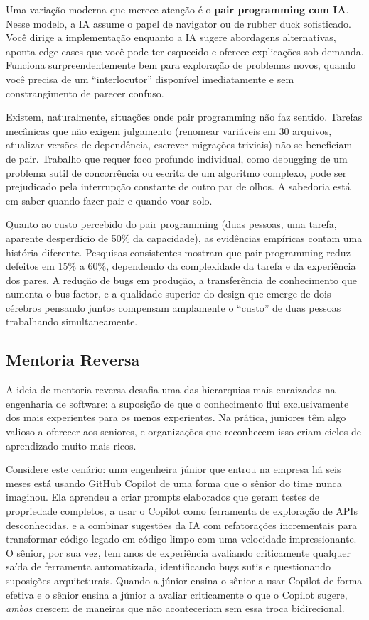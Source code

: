 Uma variação moderna que merece atenção é o \textbf{pair programming com IA}.
Nesse modelo, a IA assume o papel de navigator ou de rubber duck sofisticado.
Você dirige a implementação enquanto a IA sugere abordagens alternativas,
aponta edge cases que você pode ter esquecido e oferece explicações sob
demanda. Funciona surpreendentemente bem para exploração de problemas novos,
quando você precisa de um ``interlocutor'' disponível imediatamente e sem
constrangimento de parecer confuso.

Existem, naturalmente, situações onde pair programming não faz sentido.
Tarefas mecânicas que não exigem julgamento (renomear variáveis em 30
arquivos, atualizar versões de dependência, escrever migrações triviais)
não se beneficiam de pair. Trabalho que requer foco profundo individual,
como debugging de um problema sutil de concorrência ou escrita de um
algoritmo complexo, pode ser prejudicado pela interrupção constante de outro
par de olhos. A sabedoria está em saber quando fazer pair e quando voar solo.

Quanto ao custo percebido do pair programming (duas pessoas, uma tarefa,
aparente desperdício de 50\% da capacidade), as evidências empíricas
contam uma história diferente. Pesquisas consistentes mostram que pair
programming reduz defeitos em 15\% a 60\%, dependendo da complexidade da
tarefa e da experiência dos pares. A redução de bugs em produção, a
transferência de conhecimento que aumenta o bus factor, e a qualidade
superior do design que emerge de dois cérebros pensando juntos compensam
amplamente o ``custo'' de duas pessoas trabalhando simultaneamente.

\subsection{Mentoria Reversa}

A ideia de mentoria reversa desafia uma das hierarquias mais enraizadas na
engenharia de software: a suposição de que o conhecimento flui exclusivamente
dos mais experientes para os menos experientes. Na prática, juniores têm algo
valioso a oferecer aos seniores, e organizações que reconhecem isso criam
ciclos de aprendizado muito mais ricos.

Considere este cenário: uma engenheira júnior que entrou na empresa há seis
meses está usando GitHub Copilot de uma forma que o sênior do time nunca
imaginou. Ela aprendeu a criar prompts elaborados que geram testes de
propriedade completos, a usar o Copilot como ferramenta de exploração de
APIs desconhecidas, e a combinar sugestões da IA com refatorações
incrementais para transformar código legado em código limpo com uma
velocidade impressionante. O sênior, por sua vez, tem anos de experiência
avaliando criticamente qualquer saída de ferramenta automatizada, identificando
bugs sutis e questionando suposições arquiteturais. Quando a júnior ensina o
sênior a usar Copilot de forma efetiva e o sênior ensina a júnior a avaliar
criticamente o que o Copilot sugere, \textit{ambos} crescem de maneiras que
não aconteceriam sem essa troca bidirecional.

